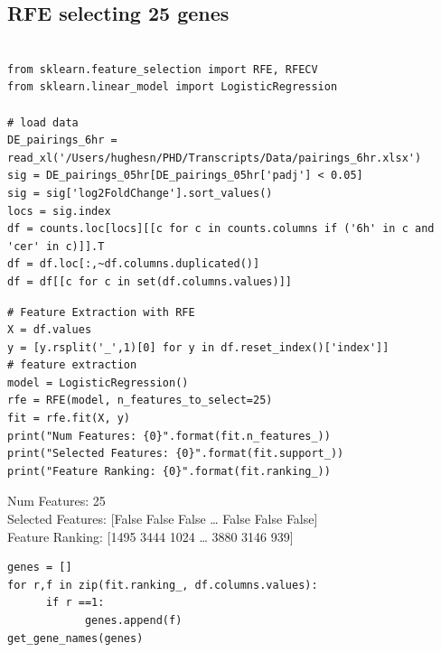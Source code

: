 \documentclass[11pt]{article}
\begin{document}
\subsection{RFE selecting 25 genes}
\label{sec:org37ece66}
\begin{verbatim}

from sklearn.feature_selection import RFE, RFECV
from sklearn.linear_model import LogisticRegression

# load data
DE_pairings_6hr = read_xl('/Users/hughesn/PHD/Transcripts/Data/pairings_6hr.xlsx')
sig = DE_pairings_05hr[DE_pairings_05hr['padj'] < 0.05]
sig = sig['log2FoldChange'].sort_values()
locs = sig.index
df = counts.loc[locs][[c for c in counts.columns if ('6h' in c and 'cer' in c)]].T
df = df.loc[:,~df.columns.duplicated()]
df = df[[c for c in set(df.columns.values)]]
\end{verbatim}

\begin{verbatim}
# Feature Extraction with RFE
X = df.values
y = [y.rsplit('_',1)[0] for y in df.reset_index()['index']]
# feature extraction
model = LogisticRegression()
rfe = RFE(model, n_features_to_select=25)
fit = rfe.fit(X, y)
print("Num Features: {0}".format(fit.n_features_))
print("Selected Features: {0}".format(fit.support_))
print("Feature Ranking: {0}".format(fit.ranking_))
\end{verbatim}

Num Features: 25\\
Selected Features: [False False False \ldots{} False False False]\\
Feature Ranking: [1495 3444 1024 \ldots{} 3880 3146  939]\\


\begin{verbatim}
genes = []
for r,f in zip(fit.ranking_, df.columns.values):
      if r ==1:
            genes.append(f)
get_gene_names(genes)
\end{verbatim}
\end{document}
